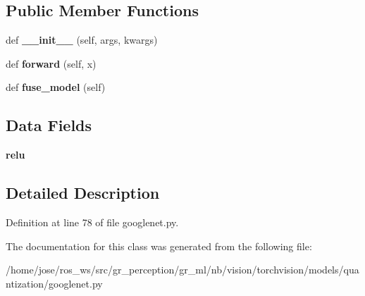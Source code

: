 \subsection*{Public Member Functions}
\begin{DoxyCompactItemize}
\item 
\mbox{\label{classtorchvision_1_1models_1_1quantization_1_1googlenet_1_1QuantizableBasicConv2d_a2cc2ac88ebb44818a24f494f3174d3ee}} 
def {\bfseries \+\_\+\+\_\+init\+\_\+\+\_\+} (self, args, kwargs)
\item 
\mbox{\label{classtorchvision_1_1models_1_1quantization_1_1googlenet_1_1QuantizableBasicConv2d_aabe98669dea15ddd1c2d2481778cb262}} 
def {\bfseries forward} (self, x)
\item 
\mbox{\label{classtorchvision_1_1models_1_1quantization_1_1googlenet_1_1QuantizableBasicConv2d_ae3564e00d6921ad6cbed8903ffb67203}} 
def {\bfseries fuse\+\_\+model} (self)
\end{DoxyCompactItemize}
\subsection*{Data Fields}
\begin{DoxyCompactItemize}
\item 
\mbox{\label{classtorchvision_1_1models_1_1quantization_1_1googlenet_1_1QuantizableBasicConv2d_abe8cc567c32b28c1ea090f9fd719ad08}} 
{\bfseries relu}
\end{DoxyCompactItemize}


\subsection{Detailed Description}


Definition at line 78 of file googlenet.\+py.



The documentation for this class was generated from the following file\+:\begin{DoxyCompactItemize}
\item 
/home/jose/ros\+\_\+ws/src/gr\+\_\+perception/gr\+\_\+ml/nb/vision/torchvision/models/quantization/googlenet.\+py\end{DoxyCompactItemize}
